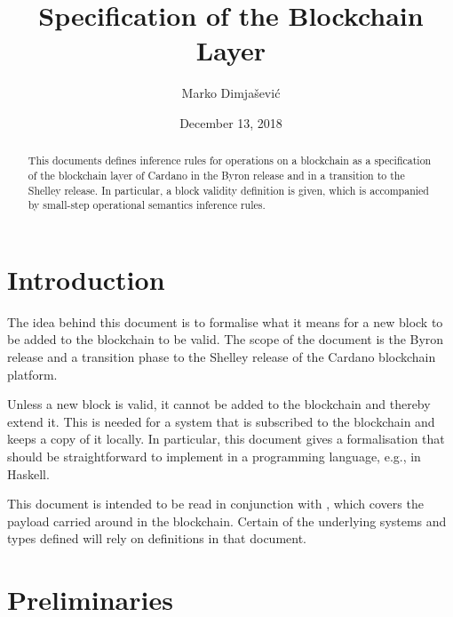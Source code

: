 \documentclass[11pt,a4paper]{article}
\begin{document}
\title{Specification of the Blockchain Layer}

\author{Marko Dimjašević}

\date{December 13, 2018}

\maketitle

\begin{abstract}
  This documents defines inference rules for operations on a blockchain as a
  specification of the blockchain layer of Cardano in the Byron release and in
  a transition to the Shelley release.
  In particular, a block validity definition is given, which is accompanied by
  small-step operational semantics inference rules.
\end{abstract}

\tableofcontents
\listoffigures

\section{Introduction}
\label{sec:introduction}

The idea behind this document is to formalise what it means for a new block to
be added to the blockchain to be valid.
%
The scope of the document is the Byron release and a transition phase to the
Shelley release of the Cardano blockchain platform.


Unless a new block is valid, it cannot be added to the blockchain and thereby
extend it.
%
This is needed for a system that is subscribed to the blockchain and keeps a
copy of it locally.
%
In particular, this document gives a formalisation that should be
straightforward to implement in a programming language, e.g., in Haskell.

This document is intended to be read in conjunction with \cite{byron_ledger_spec},
which covers the payload carried around in the blockchain. Certain of the
underlying systems and types defined will rely on definitions in that document.

\section{Preliminaries}
\label{sec:preliminaries}
\end{document}
